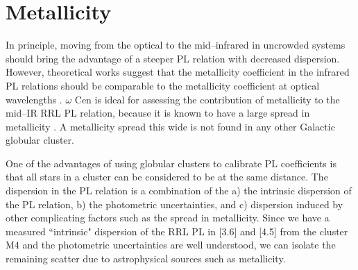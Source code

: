 \documentclass[a4paper,fleqn,usenatbib]{mnras}
\begin{document}
%


\section{Metallicity}
\label{sec:metallicity}

In principle, moving from the optical to the mid--infrared in uncrowded systems should bring the advantage of a steeper PL relation with decreased dispersion. However, theoretical works suggest that the metallicity coefficient in the infrared PL relations should be comparable to the metallicity coefficient at optical wavelengths \citep{2001MNRAS.326.1183B, 2004ApJS..154..633C, 2015ApJ...808...50M}. 
 $\omega$ Cen is ideal for assessing the contribution of metallicity to the mid--IR RRL PL relation, because it is known to have a large spread in metallicity \citep[$0.8~\leq~\Delta~\text{[Fe/H]}~\leq~1.4$~dex][]{2014ApJ...791..107V, 2012ApJ...746...14M, 2010ApJ...722.1373J}. A metallicity spread this wide is not found in any other Galactic globular cluster. 

One of the advantages of using globular clusters to calibrate PL coefficients is that all stars in a cluster can be considered to be at the same distance. The dispersion in the PL relation is a combination of the a) the intrinsic dispersion of the PL relation, b) the photometric uncertainties, and c) dispersion induced by other complicating factors such as the spread in metallicity. %
Since we have a measured ``intrinsic" dispersion of the RRL PL in [3.6] and [4.5] from the cluster M4 \citep{2015ApJ...808...11N} and the photometric uncertainties are well understood, we can isolate the remaining scatter due to astrophysical sources such as metallicity. 
\end{document}
